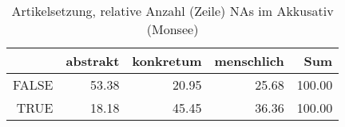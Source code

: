\begin{table}[ht]
\centering
\begin{tabular}{rrrrr}
  \hline
 & abstrakt & konkretum & menschlich & Sum \\ 
  \hline
FALSE & 53.38 & 20.95 & 25.68 & 100.00 \\ 
  TRUE & 18.18 & 45.45 & 36.36 & 100.00 \\ 
   \hline
\end{tabular}
\caption{Artikelsetzung, relative Anzahl (Zeile) NAs im Akkusativ (Monsee)} 
\end{table}
